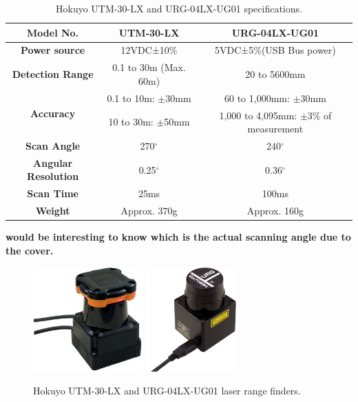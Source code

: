 \begin{table}[h!]
\begin{tabular}{|c|c|c|}
\hline \bf{Model No.}& \bf{UTM-30-LX} & \bf{URG-04LX-UG01} \\
\hline \bf{Power source} & 12VDC±10\% & 5VDC±5\%(USB Bus power) \\
\hline \bf{Detection Range} & 0.1 to 30m (Max. 60m) & 20 to 5600mm \\
\hline \multirow{2}{*}{\bf{Accuracy}}
& 0.1 to 10m: $\pm$30mm  & 60 to 1,000mm: $\pm$30mm \\
& 10 to 30m: $\pm$50mm & 1,000 to 4,095mm: $\pm$3\% of measurement \\
\hline \bf{Scan Angle} & 270$^{\circ}$ & 240$^{\circ}$ \\
\hline \bf{Angular Resolution} & 0.25$^{\circ}$ & 0.36$^{\circ}$ \\
\hline \bf{Scan Time} & 25ms  & 100ms \\
\hline \bf{Weight} & Approx. 370g  & Approx. 160g \\
\hline
\end{tabular}
\caption{Hokuyo UTM-30-LX and URG-04LX-UG01 specifications.}
\end{table}

{\bf would be interesting to know which is the actual scanning angle due to the cover.}

\begin{figure}[h!]
\begin{center}
\includegraphics[height=4cm]{fig/utm30lx.jpg}
\includegraphics[height=4cm]{fig/urg04lxug01.jpg}
\end{center}
\caption{Hokuyo UTM-30-LX and URG-04LX-UG01 laser range finders.}
\label{fig:laserscans}
\end{figure}

